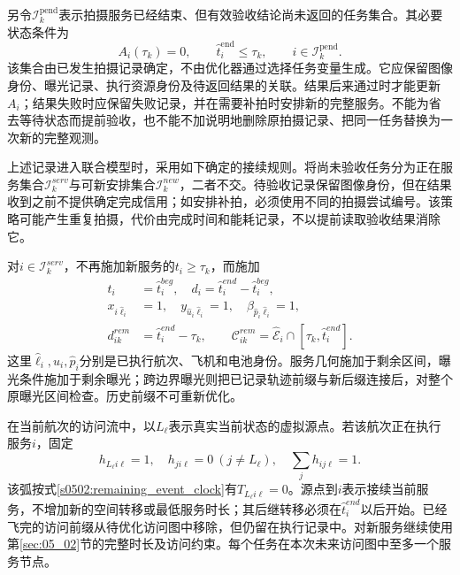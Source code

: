 另令$\mathcal I_k^{\mathrm{pend}}$表示拍摄服务已经结束、但有效验收结论尚未返回的任务集合。其必要状态条件为
\begin{equation}
 A_i(\tau_k)=0,\qquad
 \widehat t_i^{\mathrm{end}}\le\tau_k,
 \qquad i\in\mathcal I_k^{\mathrm{pend}}.
 \label{s0507:pending_acceptance}
\end{equation}
该集合由已发生拍摄记录确定，不由优化器通过选择任务变量生成。它应保留图像身份、曝光记录、执行资源身份及待返回结果的关联。结果后来通过时才能更新$A_i$；结果失败时应保留失败记录，并在需要补拍时安排新的完整服务。不能为省去等待状态而提前验收，也不能不加说明地删除原拍摄记录、把同一任务替换为一次新的完整观测。

上述记录进入联合模型时，采用如下确定的接续规则。将尚未验收任务分为正在服务集合$\mathcal I_k^{serv}$与可新安排集合$\mathcal I_k^{new}$，二者不交。待验收记录保留图像身份，但在结果收到之前不提供确定完成信用；如安排补拍，必须使用不同的拍摄尝试编号。该策略可能产生重复拍摄，代价由完成时间和能耗记录，不以提前读取验收结果消除它。

对$i\in\mathcal I_k^{serv}$，不再施加新服务的$t_i\ge\tau_k$，而施加
\begin{align}
 t_i&=\widehat t_i^{beg},\quad d_i=\widehat t_i^{end}-\widehat t_i^{beg},\\
 x_{i\widehat\ell_i}&=1,\quad y_{\widehat u_i\widehat\ell_i}=1,
 \quad\beta_{\widehat p_i\widehat\ell_i}=1,\\
 d_{ik}^{rem}&=\widehat t_i^{end}-\tau_k,\qquad
 \mathcal C_{ik}^{rem}=\widehat{\mathcal E}_i\cap[\tau_k,\widehat t_i^{end}].
 \label{s0507:service_carryover}
\end{align}
这里$\widehat\ell_i,\widehat u_i,\widehat p_i$分别是已执行航次、飞机和电池身份。服务几何施加于剩余区间，曝光条件施加于剩余曝光；跨边界曝光则把已记录轨迹前缀与新后缀连接后，对整个原曝光区间检查。历史前缀不可重新优化。

在当前航次的访问流中，以$L_\ell$表示真实当前状态的虚拟源点。若该航次正在执行服务$i$，固定
\begin{equation}
 h_{L_\ell i\ell}=1,\quad
 h_{ji\ell}=0\ (j\ne L_\ell),\quad
 \sum_j h_{ij\ell}=1.
 \label{s0507:ongoing_flow}
\end{equation}
该弧按式\eqref{s0502:remaining_event_clock}有$T_{L_\ell i\ell}=0$。源点到$i$表示接续当前服务，不增加新的空间转移或最低服务时长；其后继转移必须在$\widehat t_i^{end}$以后开始。已经飞完的访问前缀从待优化访问图中移除，但仍留在执行记录中。对新服务继续使用第\ref{sec:05_02}节的完整时长及访问约束。每个任务在本次未来访问图中至多一个服务节点。

